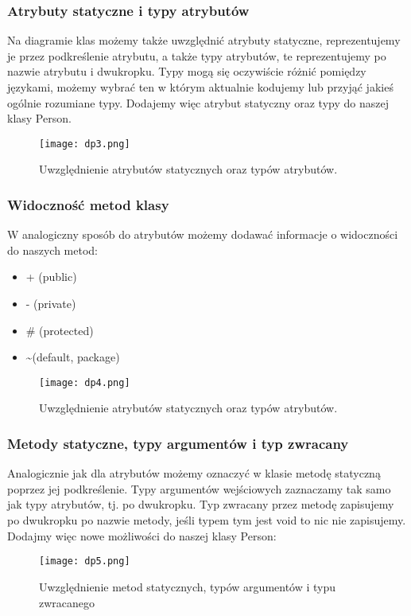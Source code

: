 \documentclass[a4paper,15pt]{article}
\begin{document}
\subsubsection{Atrybuty statyczne i typy atrybutów}
Na diagramie klas możemy także uwzględnić atrybuty statyczne, reprezentujemy je przez podkreślenie atrybutu, a także typy atrybutów, te reprezentujemy po nazwie atrybutu i dwukropku. Typy mogą się oczywiście różnić pomiędzy językami, możemy wybrać ten w którym aktualnie kodujemy lub przyjąć jakieś ogólnie rozumiane typy. Dodajemy więc atrybut statyczny oraz typy do naszej klasy Person.

\begin{figure}[H]
\centering
  \texttt{[image: dp3.png]}
  \caption{Uwzględnienie atrybutów statycznych oraz typów atrybutów.}
\end{figure}



\subsubsection{Widoczność metod klasy}
W analogiczny sposób do atrybutów możemy dodawać informacje o widoczności do naszych metod:
\begin{itemize}
\item + (public)
\item - (private)
\item \# (protected)
\item \textasciitilde (default, package)
\end{itemize}


\begin{figure}[H]
\centering
  \texttt{[image: dp4.png]}
  \caption{Uwzględnienie atrybutów statycznych oraz typów atrybutów.}
\end{figure}


\subsubsection{Metody statyczne, typy argumentów i typ zwracany}
Analogicznie jak dla atrybutów możemy oznaczyć w klasie metodę statyczną poprzez jej podkreślenie. Typy argumentów wejściowych zaznaczamy tak samo jak typy atrybutów, tj. po dwukropku. Typ zwracany przez metodę zapisujemy po dwukropku po nazwie metody, jeśli typem tym jest void to nic nie zapisujemy. Dodajmy więc nowe możliwości do naszej klasy Person:

\begin{figure}[H]
\centering
  \texttt{[image: dp5.png]}
  \caption{Uwzględnienie metod statycznych, typów argumentów i typu zwracanego}
\end{figure}
\end{document}
